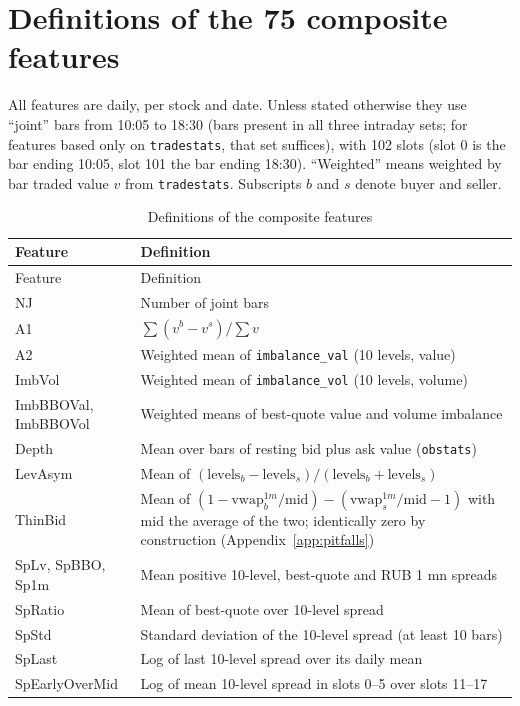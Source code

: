 \appendix

\section{Definitions of the 75 composite features}\label{app:features}

All features are daily, per stock and date. Unless stated otherwise they use ``joint'' bars from 10:05 to 18:30 (bars present in all three intraday sets; for features based only on \texttt{tradestats}, that set suffices), with 102 slots (slot 0 is the bar ending 10:05, slot 101 the bar ending 18:30). ``Weighted'' means weighted by bar traded value $v$ from \texttt{tradestats}. Subscripts $b$ and $s$ denote buyer and seller.

\small
\begin{longtable}{@{}R{3.0cm}p{12.6cm}@{}}
\caption{Definitions of the composite features}\label{tab:features}\\
\toprule
Feature & Definition \\
\midrule
\endfirsthead
\toprule
Feature & Definition \\
\midrule
\endhead
\bottomrule
\endlastfoot
NJ & Number of joint bars \\
A1 & $\sum(v^b-v^s)/\sum v$ \\
A2 & Weighted mean of \texttt{imbalance\_val} (10 levels, value) \\
ImbVol & Weighted mean of \texttt{imbalance\_vol} (10 levels, volume) \\
ImbBBOVal, ImbBBOVol & Weighted means of best-quote value and volume imbalance \\
Depth & Mean over bars of resting bid plus ask value (\texttt{obstats}) \\
LevAsym & Mean of $(\text{levels}_b-\text{levels}_s)/(\text{levels}_b+\text{levels}_s)$ \\
ThinBid & Mean of $(1-\text{vwap}^{1m}_b/\text{mid})-(\text{vwap}^{1m}_s/\text{mid}-1)$ with mid the average of the two; identically zero by construction (Appendix~\ref{app:pitfalls}) \\
SpLv, SpBBO, Sp1m & Mean positive 10-level, best-quote and RUB 1 mn spreads \\
SpRatio & Mean of best-quote over 10-level spread \\
SpStd & Standard deviation of the 10-level spread (at least 10 bars) \\
SpLast & Log of last 10-level spread over its daily mean \\
SpEarlyOverMid & Log of mean 10-level spread in slots 0--5 over slots 11--17 \\

\end{longtable}
